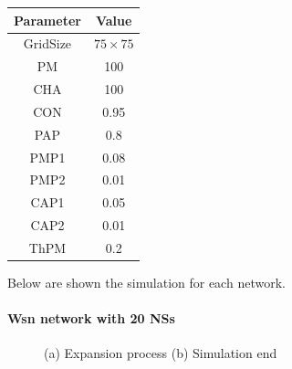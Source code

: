 \begin{center}
 \begin{tabular}{||c c||} 
 \hline
 Parameter & Value \\ [0.5ex] 
 \hline\hline
 GridSize & $75 \times 75$ \\ 
 \hline
 PM & 100 \\ 
 \hline
 CHA & 100 \\ 
 \hline
 CON & 0.95 \\ 
 \hline
 PAP & 0.8 \\ 
 \hline
 PMP1 & 0.08 \\ 
 \hline
 PMP2 & 0.01 \\ 
 \hline
 CAP1 & 0.05 \\ 
 \hline
 CAP2 & 0.01 \\ 
 \hline
 ThPM & 0.2 \\ [1ex] 
 \hline
 \end{tabular}
\end{center}

Below are shown the simulation for each network. 

\paragraph{Wsn network with 20 NSs}

\begin{figure}[H]
    \centering
    \caption{(a) Expansion process (b) Simulation end}
    \label{fig:foobar}
\end{figure}

